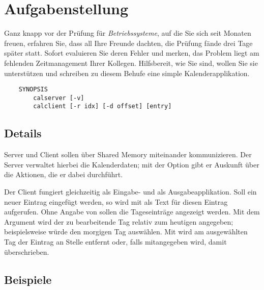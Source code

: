 




\section*{Aufgabenstellung}

Ganz knapp vor der Prüfung für \emph{Betriebssysteme}, auf die Sie sich seit
Monaten freuen, erfahren Sie, dass all Ihre Freunde dachten, die Prüfung fände
drei Tage später statt. Sofort evaluieren Sie deren Fehler und merken, das
Problem liegt am fehlenden Zeitmanagement Ihrer Kollegen. Hilfsbereit, wie Sie
sind, wollen Sie sie unterstützen und schreiben zu diesem Behufe eine simple
Kalenderapplikation.

\begin{verbatim}
    SYNOPSIS
        calserver [-v]
        calclient [-r idx] [-d offset] [entry]
\end{verbatim}

\subsection*{Details}

Server und Client sollen über Shared Memory miteinander kommunizieren. Der
Server verwaltet hierbei die Kalenderdaten; mit der Option  gibt er
Auskunft über die Aktionen, die er dabei durchführt.

Der Client fungiert gleichzeitig als Eingabe- und als Ausgabeapplikation. Soll
ein neuer Eintrag eingefügt werden, so wird  mit
 als Text für diesen Eintrag aufgerufen. Ohne Angabe von
 sollen die Tageseinträge angezeigt werden. Mit dem Argument
 wird der zu bearbeitende Tag relativ zum heutigen angegeben;
beispielsweise würde  den morgigen Tag auswählen. Mit  wird am ausgewählten Tag der Eintrag an Stelle  entfernt
oder, falls  mitangegeben wird, damit überschrieben.

\subsection*{Beispiele}


